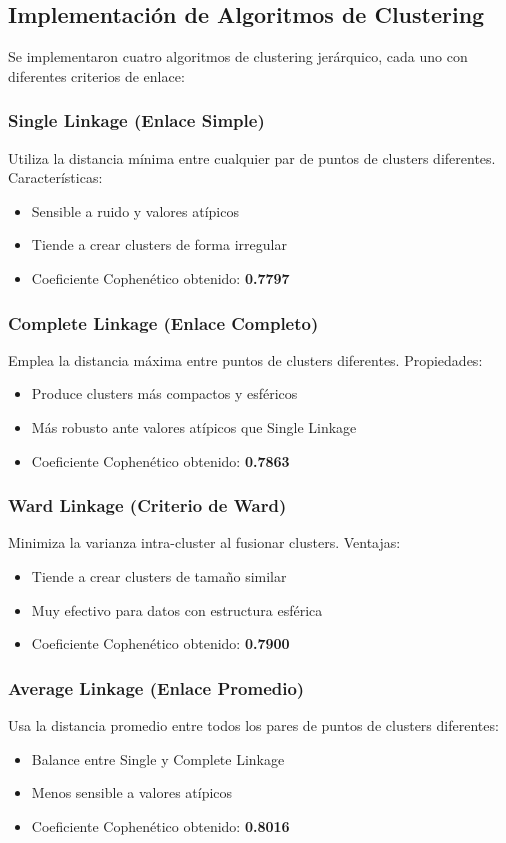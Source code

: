 \documentclass[12pt,a4paper]{article}
\begin{document}
\subsection{Implementación de Algoritmos de Clustering}
Se implementaron cuatro algoritmos de clustering jerárquico, cada uno con diferentes criterios de enlace:

\subsubsection{Single Linkage (Enlace Simple)}
Utiliza la distancia mínima entre cualquier par de puntos de clusters diferentes. Características:
\begin{itemize}
    \item Sensible a ruido y valores atípicos
    \item Tiende a crear clusters de forma irregular
    \item Coeficiente Cophenético obtenido: \textbf{0.7797}
\end{itemize}

\subsubsection{Complete Linkage (Enlace Completo)}
Emplea la distancia máxima entre puntos de clusters diferentes. Propiedades:
\begin{itemize}
    \item Produce clusters más compactos y esféricos
    \item Más robusto ante valores atípicos que Single Linkage
    \item Coeficiente Cophenético obtenido: \textbf{0.7863}
\end{itemize}

\subsubsection{Ward Linkage (Criterio de Ward)}
Minimiza la varianza intra-cluster al fusionar clusters. Ventajas:
\begin{itemize}
    \item Tiende a crear clusters de tamaño similar
    \item Muy efectivo para datos con estructura esférica
    \item Coeficiente Cophenético obtenido: \textbf{0.7900}
\end{itemize}

\subsubsection{Average Linkage (Enlace Promedio)}
Usa la distancia promedio entre todos los pares de puntos de clusters diferentes:
\begin{itemize}
    \item Balance entre Single y Complete Linkage
    \item Menos sensible a valores atípicos
    \item Coeficiente Cophenético obtenido: \textbf{0.8016}
\end{itemize}
\end{document}
